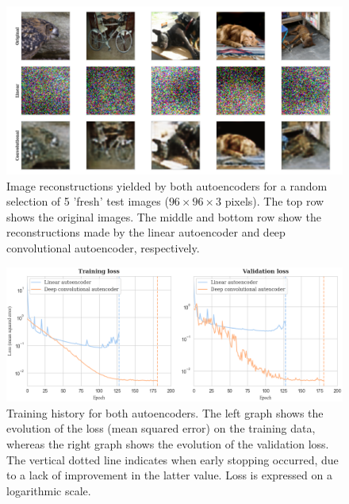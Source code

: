 \begin{figure}[!htbp]
	\begin{center}
		\includegraphics[width=\linewidth, keepaspectratio]{images/auto_reconstruction}
		\caption{Image reconstructions yielded by both autoencoders for a random selection of 5 'fresh' test images ($96\times96\times3$ pixels). The top row shows the original images. The middle and bottom row show the reconstructions made by the linear autoencoder and deep convolutional autoencoder, respectively.}
		\label{fig:auto_visual}
	\end{center}
\end{figure}

\begin{figure}[!htbp]
	\begin{center}
		\includegraphics[width=\linewidth, keepaspectratio]{images/auto_histories}
		\caption{Training history for both autoencoders. The left graph shows the evolution of the loss (mean squared error) on the training data, whereas the right graph shows the evolution of the validation loss. The vertical dotted line indicates when early stopping occurred, due to a lack of improvement in the latter value. Loss is expressed on a logarithmic scale.}
		\label{fig:auto_histories}
	\end{center}
\end{figure}

